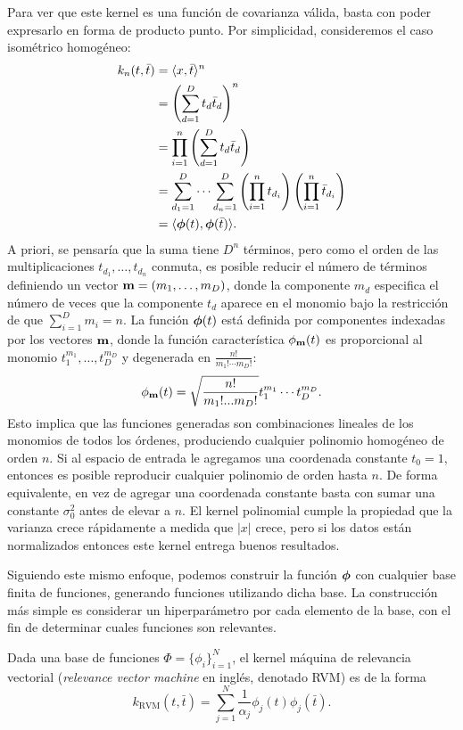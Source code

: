 Para ver que este kernel es una función de covarianza válida, basta con poder expresarlo en forma de producto punto. Por simplicidad, consideremos el caso isométrico homogéneo:
\begin{align*}
	k_{n}(t, \bar{t})	&= \langle x, \bar{t} \rangle^{n} \\
						&= \left(\sum_{d=1}^{D} t_{d} \bar{t}_{d}\right)^{n}\\
						&= \prod_{i=1}^{n} \left(\sum_{d=1}^{D} t_{d} \bar{t}_{d}\right) \\
						&= \sum_{d_{1}=1}^{D} \dotsb \sum_{d_{n}=1}^{D} \left(\prod_{i=1}^{n} t_{d_{i}}\right) \left(\prod_{i=1}^{n} \bar{t}_{d_{i}}\right)\\
						&= \langle \boldsymbol{\phi}(t), \boldsymbol{\phi}(\bar{t}) \rangle.
\end{align*}
A priori, se pensaría que la suma tiene \(D^{n}\) términos, pero como el orden de las multiplicaciones \(t_{d_{1}}, \dotsc, t_{d_{n}}\) conmuta, es posible reducir el número de términos definiendo un vector \(\mathbf{m} = (m_1, \dotsc, m_D)\), donde la componente \(m_{d}\) especifica el número de veces que la componente \(t_{d}\) aparece en el monomio bajo la restricción de que \(\sum_{i=1}^{D} m_{i} = n\). La función \(\boldsymbol{\phi}(t)\) está definida por componentes indexadas por los vectores \(\mathbf{m}\), donde la función característica \(\phi_{\mathbf{m}}(t)\) es proporcional al monomio \(t_{1}^{m_{1}}, \dotsc, t_{D}^{m_{D}}\) y degenerada en \(\frac{n!}{m_{1}! \dotsb m_{D}!}\):
\begin{equation*}
	\phi_{\mathbf{m}}(t) = \sqrt{\frac{n!}{m_{1}!...m_{D}!}} t_{1}^{m_{1}} \dotsb t_{D}^{m_{D}}.
\end{equation*}
Esto implica que las funciones generadas son combinaciones lineales de los monomios de todos los órdenes, produciendo cualquier polinomio homogéneo de orden \(n\). Si al espacio de entrada le agregamos una coordenada constante \(t_{0} = 1\), entonces es posible reproducir cualquier polinomio de orden hasta \(n\). De forma equivalente, en vez de agregar una coordenada constante basta con sumar una constante \(\sigma_{0}^{2}\) antes de elevar a \(n\). El kernel polinomial cumple la propiedad que la varianza crece rápidamente a medida que \(\vert x \vert\) crece, pero si los datos están normalizados entonces este kernel entrega buenos resultados.

Siguiendo este mismo enfoque, podemos construir la función \(\boldsymbol{\phi}\) con cualquier base finita de funciones, generando funciones utilizando dicha base. La construcción más simple es considerar un hiperparámetro por cada elemento de la base, con el fin de determinar cuales funciones son relevantes.
\begin{definition}
	Dada una base de funciones \(\Phi = \{\phi_{i}\}_{i=1}^{N}\), el kernel máquina de relevancia vectorial (\emph{relevance vector machine} en inglés, denotado RVM) es de la forma
	\begin{equation*}
		k_{\mathrm{RVM}}(t, \bar{t}) = \sum_{j=1}^{N} \frac{1}{\alpha_{j}} \phi_{j}(t) \phi_{j}(\bar{t}).
	\end{equation*}
\end{definition}

